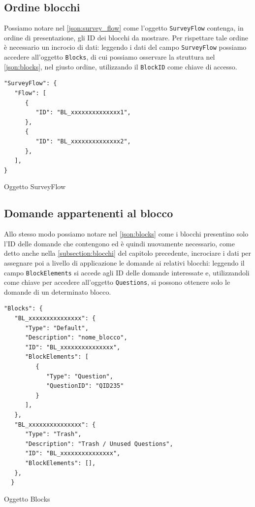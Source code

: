 \subsection{Ordine blocchi}
Possiamo notare nel \autoref{json:survey_flow} come l'oggetto \texttt{SurveyFlow} contenga, in ordine di presentazione, gli ID dei blocchi da mostrare. Per rispettare tale ordine è necessario un incrocio di dati: leggendo i dati del campo \texttt{SurveyFlow} possiamo accedere all'oggetto \texttt{Blocks}, di cui possiamo osservare la struttura nel \autoref{json:blocks}, nel giusto ordine, utilizzando il \texttt{BlockID} come chiave di accesso.

\begin{json}
\begin{verbatim}
"SurveyFlow": {
   "Flow": [
      {
         "ID": "BL_xxxxxxxxxxxxxx1",
      },
      {
         "ID": "BL_xxxxxxxxxxxxxx2",
      },
   ],
}
\end{verbatim}
\caption{Oggetto SurveyFlow}
\label{json:survey_flow}
\end{json}

\newpage
\subsection{Domande appartenenti al blocco}
Allo stesso modo possiamo notare nel \autoref{json:blocks} come i blocchi presentino solo l'ID delle domande che contengono ed è quindi nuovamente necessario, come detto anche nella \autoref{subsection:blocchi} del capitolo precedente, incrociare i dati per assegnare poi a livello di applicazione le domande ai relativi blocchi: leggendo il campo \texttt{BlockElements} si accede agli ID delle domande interessate e, utilizzandoli come chiave per accedere all'oggetto \texttt{Questions}, si possono ottenere solo le domande di un determinato blocco.

\begin{json}
\begin{verbatim}
"Blocks": {
   "BL_xxxxxxxxxxxxxxx": {
      "Type": "Default",
      "Description": "nome_blocco",
      "ID": "BL_xxxxxxxxxxxxxxx",
      "BlockElements": [
         {
            "Type": "Question",
            "QuestionID": "QID235"
         }
      ],
   },
   "BL_xxxxxxxxxxxxxxx": {
      "Type": "Trash",
      "Description": "Trash / Unused Questions",
      "ID": "BL_xxxxxxxxxxxxxxx",
      "BlockElements": [],
   },
  }
\end{verbatim}
\caption{Oggetto Blocks}
\label{json:blocks}
\end{json}

